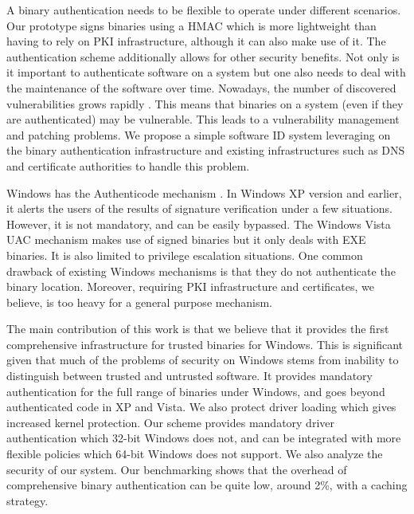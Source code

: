A binary authentication needs to be flexible to operate under different scenarios.
Our prototype signs binaries using a HMAC \cite{krawczyk1997rfc2104} which is more lightweight
than having to rely on PKI infrastructure, although it can also make use of it.
The authentication scheme additionally allows for other security benefits.
Not only is it important to authenticate software on a system but one also needs
to deal with the maintenance of the software over time.
Nowadays, the number of discovered vulnerabilities grows rapidly 
\cite{CERT-vul}.
This means that binaries on a system (even if they are authenticated) may
be vulnerable. This leads to a vulnerability management and patching problems.
We propose a simple software ID system leveraging on the binary
authentication infrastructure and existing infrastructures such as DNS and certificate authorities
to handle this problem.

Windows has the Authenticode mechanism \cite{authenticode}.
In Windows XP version and earlier, 
it alerts the users of the results of signature verification under
a few situations. However, it is not mandatory, and can be easily bypassed.
The Windows Vista UAC mechanism makes use of signed binaries but it only
deals with EXE binaries. It is also limited to privilege escalation situations.
One common drawback of existing Windows mechanisms is that they do not 
authenticate the binary location.
Moreover, requiring PKI infrastructure and certificates, 
we believe, is too heavy for a general purpose mechanism.

The main contribution of this work is that we believe that it provides the first
comprehensive infrastructure for trusted binaries for Windows.
This is significant given that much of the problems of security on Windows stems from
inability to distinguish between trusted and untrusted software.
It provides mandatory authentication for the full range of binaries under Windows, and goes beyond
authenticated code in XP and Vista.
We also protect driver loading which gives increased kernel protection.
Our scheme provides mandatory driver authentication which 32-bit Windows does not,
and can be integrated with more flexible policies which 64-bit Windows does not support.
We also analyze the security of our system. 
Our benchmarking shows that the overhead of comprehensive binary
authentication can be quite low, around 2\%,
with a caching strategy.

